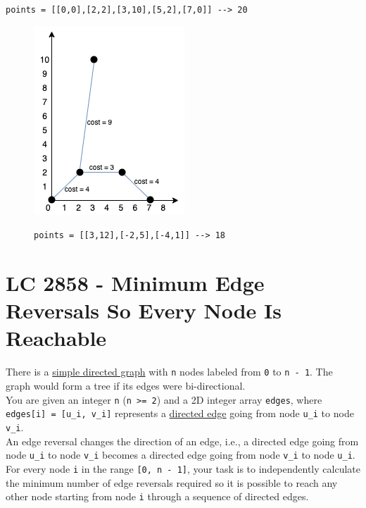 \begin{itemize}
\item {\colorbox{CodeBackground}{\lstinline|points = [[0,0],[2,2],[3,10],[5,2],[7,0]] --> 20|}}
\begin{figure}[H]
\centering
\includegraphics[width=0.25\linewidth]{images/lc1584_eg}
\label{fig:lc1584eg}
\item {\colorbox{CodeBackground}{\lstinline|points = [[3,12],[-2,5],[-4,1]] --> 18|}}
\end{figure}
\end{itemize}

\section{LC 2858 - Minimum Edge Reversals So Every Node Is Reachable}
There is a \ul{simple directed graph} with {\colorbox{CodeBackground}{\lstinline|n|}} nodes labeled from {\colorbox{CodeBackground}{\lstinline|0|}} to {\colorbox{CodeBackground}{\lstinline|n - 1|}}. The graph would form a tree if its edges were bi-directional.\\

You are given an integer {\colorbox{CodeBackground}{\lstinline|n|}} ({\colorbox{CodeBackground}{\lstinline|n >= 2|}}) and a 2D integer array {\colorbox{CodeBackground}{\lstinline|edges|}}, where {\colorbox{CodeBackground}{\lstinline|edges[i] = [u_i, v_i]|}} represents a \ul{directed edge} going from node {\colorbox{CodeBackground}{\lstinline|u_i|}} to node {\colorbox{CodeBackground}{\lstinline|v_i|}}.\\

An edge reversal changes the direction of an edge, i.e., a directed edge going from node {\colorbox{CodeBackground}{\lstinline|u_i|}} to node {\colorbox{CodeBackground}{\lstinline|v_i|}} becomes a directed edge going from node {\colorbox{CodeBackground}{\lstinline|v_i|}} to node {\colorbox{CodeBackground}{\lstinline|u_i|}}.\\

For every node {\colorbox{CodeBackground}{\lstinline|i|}} in the range {\colorbox{CodeBackground}{\lstinline|[0, n - 1]|}}, your task is to independently calculate the minimum number of edge reversals required so it is possible to reach any other node starting from node {\colorbox{CodeBackground}{\lstinline|i|}} through a sequence of directed edges.\\

